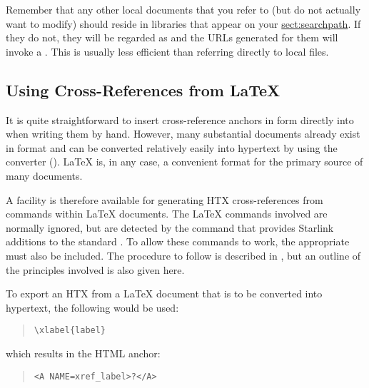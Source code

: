 Remember that any other local documents that you refer to (but do not
actually want to modify) should reside in libraries that appear on
your \hyperref{\hi{HTX\_PATH} search path}{\hi{HTX\_PATH} search path (see
\S}{)}{sect:searchpath}. If they do not, they will be regarded as
 and the URLs generated for them will invoke
a 
.
This is usually less efficient than referring directly to local files.

\subsection{\label{sect:convertingfromlatex}Using Cross-References from \LaTeX}

It is quite straightforward to insert  cross-reference
anchors in  form directly into  when
writing them by hand. However, many substantial documents already
exist in \latexref{\LaTeX} format and can be converted relatively
easily into hypertext by using the
\htmladdnormallinkfoot{\latextohtml}{\latextohtmlurl} converter
(). \LaTeX{} is, in any case, a convenient
format for the primary source of many documents.

A facility is therefore available for generating HTX cross-references
from commands within \LaTeX{} documents.  The \LaTeX{} commands
involved are normally ignored, but are detected by the
 command that provides
Starlink additions to the standard \latextohtml. To allow these
commands to work, the appropriate  must also be included. The procedure to
follow is described in , but an outline of the
principles involved is also given here.

To export an HTX  from a \LaTeX{}
document that is to be converted into hypertext, the following would
be used:

\begin{quote}
\begin{verbatim}
\xlabel{label}
\end{verbatim}
\end{quote}

which results in the HTML anchor:

\begin{quote}
\begin{verbatim}
<A NAME=xref_label>?</A>
\end{verbatim}
\end{quote}

